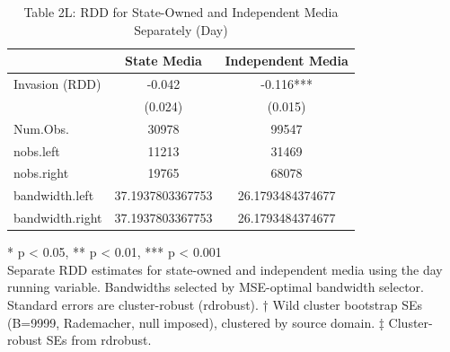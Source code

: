 \begin{table}[!t]
\caption{Table 2L: RDD for State-Owned and Independent Media Separately (Day)} 
\fontsize{12.0pt}{14.4pt}\selectfont
\begin{tabular*}{\linewidth}{@{\extracolsep{\fill}}lcc}
\toprule
  & State Media & Independent Media \\ 
\midrule\addlinespace[2.5pt]
Invasion (RDD) & -0.042 & -0.116*** \\ 
{} & {(0.024)} & {(0.015)} \\ 
Num.Obs. & 30978 & 99547 \\ 
nobs.left & 11213 & 31469 \\ 
nobs.right & 19765 & 68078 \\ 
bandwidth.left & 37.1937803367753 & 26.1793484374677 \\ 
bandwidth.right & 37.1937803367753 & 26.1793484374677 \\ 
\bottomrule
\end{tabular*}
\begin{minipage}{\linewidth}
* p < 0.05, ** p < 0.01, *** p < 0.001\\
Separate RDD estimates for state-owned and independent media using the day
running variable. Bandwidths selected by MSE-optimal bandwidth selector.
Standard errors are cluster-robust (rdrobust). † Wild cluster bootstrap SEs
(B=9999, Rademacher, null imposed), clustered by source domain. ‡ Cluster-robust
SEs from rdrobust.\\
\end{minipage}
\end{table}

